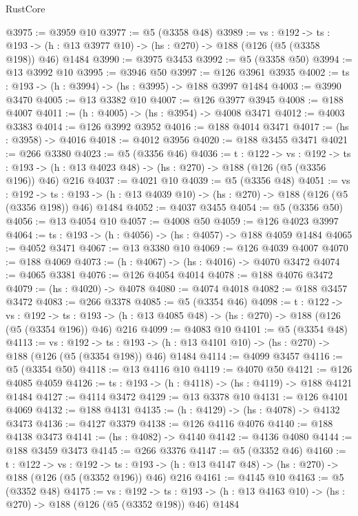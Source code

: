 \begin{lexlean}{RustCore}
\begin{coremodule}
@3975 := @3959 @10
@3977 := @5 (@3358 @48)
@3989 := {vs : @192} ->
  {ts : @193} -> (h : @13 @3977 @10) -> (hs : @270) -> @188 (@126 (@5 (@3358 @198)) @46) @1484
@3990 := @3975 @3453
@3992 := @5 (@3358 @50)
@3994 := @13 @3992 @10
@3995 := @3946 @50
@3997 := @126 @3961 @3935
@4002 := {ts : @193} -> (h : @3994) -> (hs : @3995) -> @188 @3997 @1484
@4003 := @3990 @3470
@4005 := @13 @3382 @10
@4007 := @126 @3977 @3945
@4008 := @188 @4007
@4011 := (h : @4005) -> (hs : @3954) -> @4008 @3471
@4012 := @4003 @3383
@4014 := @126 @3992 @3952
@4016 := @188 @4014 @3471
@4017 := (hs : @3958) -> @4016
@4018 := @4012 @3956
@4020 := @188 @3455 @3471
@4021 := @266 @3380
@4023 := @5 (@3356 @46)
@4036 := {t : @122} ->
  {vs : @192} ->
  {ts : @193} -> (h : @13 @4023 @48) -> (hs : @270) -> @188 (@126 (@5 (@3356 @196)) @46) @216
@4037 := @4021 @10
@4039 := @5 (@3356 @48)
@4051 := {vs : @192} ->
  {ts : @193} -> (h : @13 @4039 @10) -> (hs : @270) -> @188 (@126 (@5 (@3356 @198)) @46) @1484
@4052 := @4037 @3455
@4054 := @5 (@3356 @50)
@4056 := @13 @4054 @10
@4057 := @4008 @50
@4059 := @126 @4023 @3997
@4064 := {ts : @193} -> (h : @4056) -> (hs : @4057) -> @188 @4059 @1484
@4065 := @4052 @3471
@4067 := @13 @3380 @10
@4069 := @126 @4039 @4007
@4070 := @188 @4069
@4073 := (h : @4067) -> (hs : @4016) -> @4070 @3472
@4074 := @4065 @3381
@4076 := @126 @4054 @4014
@4078 := @188 @4076 @3472
@4079 := (hs : @4020) -> @4078
@4080 := @4074 @4018
@4082 := @188 @3457 @3472
@4083 := @266 @3378
@4085 := @5 (@3354 @46)
@4098 := {t : @122} ->
  {vs : @192} ->
  {ts : @193} -> (h : @13 @4085 @48) -> (hs : @270) -> @188 (@126 (@5 (@3354 @196)) @46) @216
@4099 := @4083 @10
@4101 := @5 (@3354 @48)
@4113 := {vs : @192} ->
  {ts : @193} -> (h : @13 @4101 @10) -> (hs : @270) -> @188 (@126 (@5 (@3354 @198)) @46) @1484
@4114 := @4099 @3457
@4116 := @5 (@3354 @50)
@4118 := @13 @4116 @10
@4119 := @4070 @50
@4121 := @126 @4085 @4059
@4126 := {ts : @193} -> (h : @4118) -> (hs : @4119) -> @188 @4121 @1484
@4127 := @4114 @3472
@4129 := @13 @3378 @10
@4131 := @126 @4101 @4069
@4132 := @188 @4131
@4135 := (h : @4129) -> (hs : @4078) -> @4132 @3473
@4136 := @4127 @3379
@4138 := @126 @4116 @4076
@4140 := @188 @4138 @3473
@4141 := (hs : @4082) -> @4140
@4142 := @4136 @4080
@4144 := @188 @3459 @3473
@4145 := @266 @3376
@4147 := @5 (@3352 @46)
@4160 := {t : @122} ->
  {vs : @192} ->
  {ts : @193} -> (h : @13 @4147 @48) -> (hs : @270) -> @188 (@126 (@5 (@3352 @196)) @46) @216
@4161 := @4145 @10
@4163 := @5 (@3352 @48)
@4175 := {vs : @192} ->
  {ts : @193} -> (h : @13 @4163 @10) -> (hs : @270) -> @188 (@126 (@5 (@3352 @198)) @46) @1484

\end{coremodule}
\end{lexlean}
